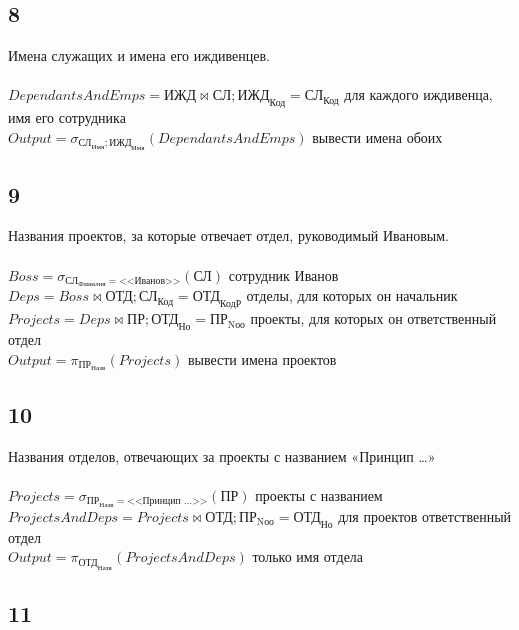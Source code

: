 \documentclass[12pt]{article}
\newcommand{\employee}{\textbf{СЛ}}
\newcommand{\department}{\textbf{ОТД}}
\newcommand{\project}{\textbf{ПР}}
\newcommand{\dependant}{\textbf{ИЖД}}
\newcommand{\employeeName}{\textbf{СЛ}_\text{Имя}}
\newcommand{\employeeLastname}{\textbf{СЛ}_\text{Фамилия}}
\newcommand{\employeeId}{\textbf{СЛ}_\text{Код}}
\newcommand{\departmentName}{\textbf{ОТД}_\text{Назв}}
\newcommand{\departmentId}{\textbf{ОТД}_\text{Но}}
\newcommand{\departmentBossId}{\textbf{ОТД}_\text{КодР}}
\newcommand{\projectName}{\textbf{ПР}_\text{Назв}}
\newcommand{\projectResponsibleDepId}{\textbf{ПР}_\text{Nоо}}
\newcommand{\dependantEmpId}{\textbf{ИЖД}_\text{Код}}
\newcommand{\dependantName}{\textbf{ИЖД}_\text{Имя}}
\newcommand{\filter}[2]{\sigma{}_{#1} \allowbreak \left( #2 \right)}
\newcommand{\join}[3]{ #1 \bowtie #2;\allowbreak #3 }
\newcommand{\select}[2]{\pi_{#1} \allowbreak \left( #2 \right)}
\begin{document}
\subsection{8}
Имена служащих и имена его иждивенцев.\\\\
$ DependantsAndEmps = \join{\dependant}{\employee}{\dependantEmpId = \employeeId} $ 
  для каждого иждивенца, имя его сотрудника  \\ 
$ Output = \filter{\employeeName; \dependantName}{DependantsAndEmps}$ 
  вывести имена обоих  \\ 

\subsection{9}
Названия проектов, за которые отвечает отдел, руководимый Ивановым.\\\\
$ Boss = \filter{\employeeLastname = \text{<<Иванов>>}}{\employee}$ 
  сотрудник Иванов  \\ 
$ Deps = \join{Boss}{\department}{\employeeId = \departmentBossId}$ 
  отделы, для которых он начальник  \\ 
$ Projects = \join{Deps}{\project}{\departmentId = \projectResponsibleDepId}$ 
   проекты, для которых он ответственный отдел \\ 
$ Output = \select{\projectName}{Projects}$ 
  вывести имена проектов  \\ 

\subsection{10}

Названия отделов, отвечающих за проекты с названием «Принцип …»\\\\
$ Projects = \filter{\projectName = \text{<<Принцип …>>}}{\project} $ 
  проекты с названием  \\ 
$ ProjectsAndDeps = \join{Projects}{\department}{\projectResponsibleDepId = \departmentId}$ 
 для проектов ответственный отдел   \\ 
$ Output = \select{\departmentName}{ProjectsAndDeps} $ 
   только имя отдела \\ 

\subsection{11}
\end{document}
